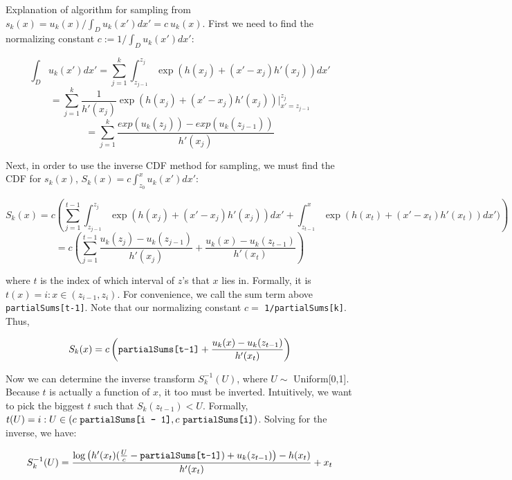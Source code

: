 \documentclass{article}
\begin{document}
Explanation of algorithm for sampling from $s_k(x) = u_k(x) / \int_D u_k(x') dx' = c \ u_k(x)$. First we need to find the normalizing constant $c := 1 / \int_D u_k(x') dx':$

$$
\int_D u_k(x') dx' = \sum_{j = 1}^k \int_{z_{j-1}}^{z_j} \exp(h(x_j) + (x' - x_j) h'(x_j)) dx'
$$
$$
 = \sum_{j = 1}^k \frac{1}{h'(x_j)} \exp(h(x_j) + (x' - x_j) h'(x_j)) \bigg\rvert^{z_j}_{x' = z_{j - 1}}
$$
$$
 = \sum_{j = 1}^k \frac{exp(u_k(z_j)) - exp(u_k(z_{j-1}))}{h'(x_j)}
$$

Next, in order to use the inverse CDF method for sampling, we must find the CDF for $s_k(x)$, $S_k(x) = c \int_{z_0}^x u_k(x') dx'$:

$$
S_k(x) = c \left(\sum_{j = 1}^{t - 1} \int_{z_{j-1}}^{z_j} \exp(h(x_j) + (x' - x_j) h'(x_j)) dx' + \int_{z_{t-1}}^x \exp(h(x_t) + (x' - x_t) h'(x_t)) dx') \right)
$$
$$
 = c \left( \sum_{j = 1}^{t-1} \frac{u_k(z_j) - u_k(z_{j-1})}{h'(x_j)} + \frac{u_k(x) - u_k(z_{t-1})}{h'(x_t)} \right)
$$

\noindent where $t$ is the index of which interval of $z$'s that $x$ lies in. Formally, it is $t(x) = i : x \in (z_{i-1}, z_i)$. For convenience, we call the sum term above \texttt{partialSums[t-1]}. Note that our normalizing constant $c =$ \texttt{1/partialSums[k]}. Thus,

$$
S_k(x) = c \left(\text{\texttt{partialSums[t-1]}} + \frac{u_k(x) - u_k(z_{t-1})}{h'(x_t)} \right)
$$

Now we can determine the inverse transform $S_k^{-1}(U)$, where $U \sim$ Uniform[0,1]. Because $t$ is actually a function of $x$, it too must be inverted. Intuitively, we want to pick the biggest $t$ such that $S_k(z_{t-1}) < U$. Formally, $t(U) = i : U \in (c\ \text{\texttt{partialSums[i - 1]}}, c\ \text{\texttt{partialSums[i]}})$. Solving for the inverse, we have:

$$
S_k^{-1}(U) = \frac{\log\left(h'(x_t) (\frac{U}{c} - \text{\texttt{partialSums[t-1]}}) + u_k(z_{t-1})\right) - h(x_t)}{h'(x_t)} + x_t
$$
\end{document}
